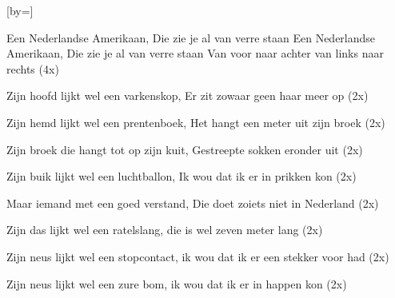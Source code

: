  

[by=]




\beginverse
Een Nederlandse Amerikaan, \brk  Die zie je al van verre staan 
Een Nederlandse Amerikaan, \brk  Die zie je al van verre staan 
Van voor naar achter van links naar rechts (4x)
\endverse


\beginverse
Zijn hoofd lijkt wel een varkenskop, \brk  Er zit zowaar geen haar meer op (2x) 
\endverse


\beginverse
Zijn hemd lijkt wel een prentenboek, \brk  Het hangt een meter uit zijn broek (2x) 
\endverse


\beginverse
Zijn broek die hangt tot op zijn kuit, \brk  Gestreepte sokken eronder uit (2x) 
\endverse


\beginverse
Zijn buik lijkt wel een luchtballon, \brk  Ik wou dat ik er in prikken kon (2x) 
\endverse


\beginverse
Maar iemand met een goed verstand, \brk  Die doet zoiets niet in Nederland (2x) 
\endverse


\beginverse
Zijn das lijkt wel een ratelslang, \brk  die is wel zeven meter lang (2x) 
\endverse


\beginverse
Zijn neus lijkt wel een stopcontact, \brk  ik wou dat ik er een stekker voor had (2x) 
\endverse


\beginverse
Zijn neus lijkt wel een zure bom, \brk  ik wou dat ik er in happen kon (2x) 
\endverse




\endsong
